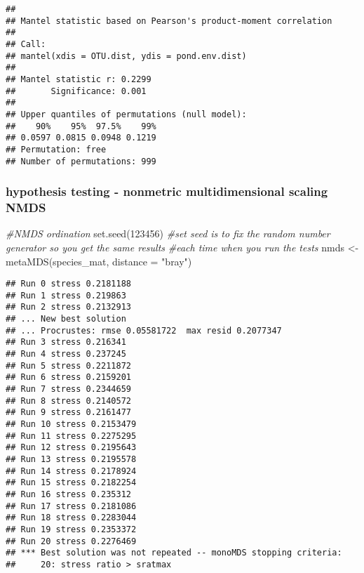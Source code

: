 \documentclass[
]{article}
\newenvironment{Shaded}{\begin{snugshade}}{\end{snugshade}}
\newcommand{\AttributeTok}[1]{\textcolor[rgb]{0.77,0.63,0.00}{#1}}
\newcommand{\CommentTok}[1]{\textcolor[rgb]{0.56,0.35,0.01}{\textit{#1}}}
\newcommand{\DecValTok}[1]{\textcolor[rgb]{0.00,0.00,0.81}{#1}}
\newcommand{\FunctionTok}[1]{\textcolor[rgb]{0.00,0.00,0.00}{#1}}
\newcommand{\NormalTok}[1]{#1}
\newcommand{\OtherTok}[1]{\textcolor[rgb]{0.56,0.35,0.01}{#1}}
\newcommand{\StringTok}[1]{\textcolor[rgb]{0.31,0.60,0.02}{#1}}
\begin{document}
\begin{verbatim}
## 
## Mantel statistic based on Pearson's product-moment correlation 
## 
## Call:
## mantel(xdis = OTU.dist, ydis = pond.env.dist) 
## 
## Mantel statistic r: 0.2299 
##       Significance: 0.001 
## 
## Upper quantiles of permutations (null model):
##    90%    95%  97.5%    99% 
## 0.0597 0.0815 0.0948 0.1219 
## Permutation: free
## Number of permutations: 999
\end{verbatim}

\hypertarget{hypothesis-testing---nonmetric-multidimensional-scaling-nmds}{%
\subsubsection{hypothesis testing - nonmetric multidimensional scaling
NMDS}\label{hypothesis-testing---nonmetric-multidimensional-scaling-nmds}}

\begin{Shaded}
\begin{Highlighting}[]
\CommentTok{\#NMDS ordination }
\FunctionTok{set.seed}\NormalTok{(}\DecValTok{123456}\NormalTok{) }\CommentTok{\#set seed is to fix the random number generator so you get the same results }
\CommentTok{\#each time when you run the tests }
\NormalTok{nmds }\OtherTok{\textless{}{-}} \FunctionTok{metaMDS}\NormalTok{(species\_mat, }\AttributeTok{distance =} \StringTok{"bray"}\NormalTok{) }
\end{Highlighting}
\end{Shaded}

\begin{verbatim}
## Run 0 stress 0.2181188 
## Run 1 stress 0.219863 
## Run 2 stress 0.2132913 
## ... New best solution
## ... Procrustes: rmse 0.05581722  max resid 0.2077347 
## Run 3 stress 0.216341 
## Run 4 stress 0.237245 
## Run 5 stress 0.2211872 
## Run 6 stress 0.2159201 
## Run 7 stress 0.2344659 
## Run 8 stress 0.2140572 
## Run 9 stress 0.2161477 
## Run 10 stress 0.2153479 
## Run 11 stress 0.2275295 
## Run 12 stress 0.2195643 
## Run 13 stress 0.2195578 
## Run 14 stress 0.2178924 
## Run 15 stress 0.2182254 
## Run 16 stress 0.235312 
## Run 17 stress 0.2181086 
## Run 18 stress 0.2283044 
## Run 19 stress 0.2353372 
## Run 20 stress 0.2276469 
## *** Best solution was not repeated -- monoMDS stopping criteria:
##     20: stress ratio > sratmax
\end{verbatim}
\end{document}
